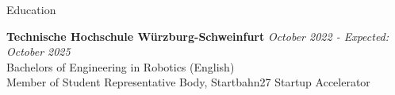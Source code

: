 \documentclass[
	a4paper, %
	10pt, %
]{resume} %
\begin{document}

\begin{rSection}{Education}

	\textbf{Technische Hochschule Würzburg-Schweinfurt} \hfill \textit{October 2022 - Expected: October 2025} \\
	Bachelors of Engineering in Robotics (English) \\
	Member of Student Representative Body, Startbahn27 Startup Accelerator

\end{rSection}

\end{document}
